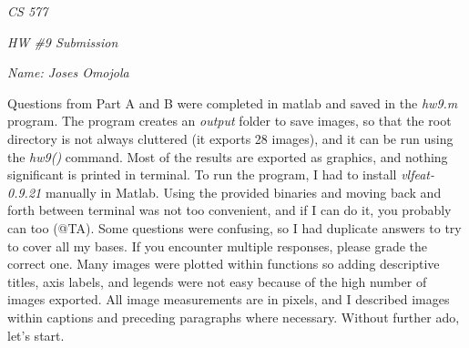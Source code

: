 \documentclass[12pt]{report}
\begin{document}
\centerline{\it CS 577}
\centerline{\it HW \#9 Submission}
\centerline{\it Name: Joses Omojola}

Questions from Part A and B were completed in matlab and saved in the \emph{hw9.m} program. The program creates an \emph{output} folder to save images, so that the 
root directory is not always cluttered (it exports 28 images), and it can be run using the \textit{hw9()} command. Most of the results are exported as graphics, and 
nothing significant is printed in terminal. To run the program, I had to install \emph{vlfeat-0.9.21} manually in Matlab. Using the provided binaries and moving back and forth 
between terminal was not too convenient, and if I can do it, you probably can too (@TA). Some questions were confusing, so I had duplicate answers to try to cover all 
my bases. If you encounter multiple responses, please grade the correct one.  Many images were plotted within functions so adding descriptive titles, axis labels, and 
legends were not easy because of the high number of images exported. All image measurements are in pixels, and I described images within captions and preceding paragraphs
where necessary. Without further ado, let's start.
\end{document}

